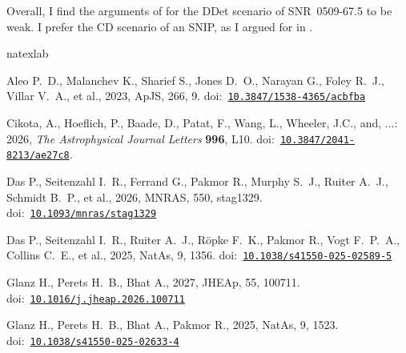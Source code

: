 \documentclass[twocolumn]{aastex701}
\begin{document}
Overall, I find the arguments of \cite{Dasetal2026} for the DDet scenario of SNR~0509-67.5 to be weak. I prefer the CD scenario of an SNIP, as I argued for in \cite{Soker2025SNR0509}. 








\begin{thebibliography}{}
\expandafter\ifx\csname natexlab\endcsname\relax\def\natexlab#1{#1}\fi
\providecommand{\url}[1]{\href{#1}{#1}}
\providecommand{\dodoi}[1]{doi:~\href{http://doi.org/#1}{\nolinkurl{#1}}}
\providecommand{\doeprint}[1]{\href{http://ascl.net/#1}{\nolinkurl{http://ascl.net/#1}}}
\providecommand{\doarXiv}[1]{\href{https://arxiv.org/abs/#1}{\nolinkurl{https://arxiv.org/abs/#1}}}

 Aleo P.~D., Malanchev K., Sharief S., Jones D.~O., Narayan G., Foley R.~J., Villar V.~A., et al., 2023, ApJS, 266, 9. \dodoi{10.3847/1538-4365/acbfba}

 Cikota, A., Hoeflich, P., Baade, D., Patat, F., Wang, L., Wheeler, J.C., and, ...: 2026, {\it The Astrophysical Journal Letters} {\bf 996}, L10. \dodoi{10.3847/2041-8213/ae27c8}.

  Das P., Seitenzahl I.~R., Ferrand G., Pakmor R., Murphy S.~J., Ruiter A.~J., Schmidt B.~P., et al., 2026, MNRAS, 550, stag1329. \dodoi{10.1093/mnras/stag1329}

 Das P., Seitenzahl I.~R., Ruiter A.~J., R{\"o}pke F.~K., Pakmor R., Vogt F.~P.~A., Collins C.~E., et al., 2025, NatAs, 9, 1356. \dodoi{10.1038/s41550-025-02589-5}

 Glanz H., Perets H.~B., Bhat A., 2027, JHEAp, 55, 100711. \dodoi{10.1016/j.jheap.2026.100711}

 Glanz H., Perets H.~B., Bhat A., Pakmor R., 2025, NatAs, 9, 1523. \dodoi{10.1038/s41550-025-02633-4}


\end{thebibliography}
\end{document}
